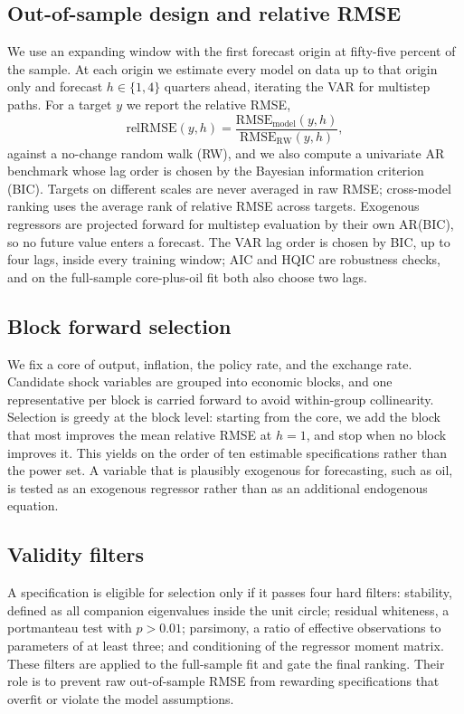 \documentclass[conference]{IEEEtran}
\begin{document}
\subsection{Out-of-sample design and relative RMSE}
We use an expanding window with the first forecast origin at fifty-five percent of the sample. At each origin we estimate every model on data up to that origin only and forecast $h\in\{1,4\}$ quarters ahead, iterating the VAR for multistep paths. For a target $y$ we report the relative RMSE,
\begin{equation}
\mathrm{relRMSE}(y,h) = \frac{\mathrm{RMSE}_{\text{model}}(y,h)}{\mathrm{RMSE}_{\text{RW}}(y,h)},
\end{equation}
against a no-change random walk (RW), and we also compute a univariate AR benchmark whose lag order is chosen by the Bayesian information criterion (BIC). Targets on different scales are never averaged in raw RMSE; cross-model ranking uses the average rank of relative RMSE across targets. Exogenous regressors are projected forward for multistep evaluation by their own AR(BIC), so no future value enters a forecast. The VAR lag order is chosen by BIC, up to four lags, inside every training window; AIC and HQIC are robustness checks, and on the full-sample core-plus-oil fit both also choose two lags.

\subsection{Block forward selection}
We fix a core of output, inflation, the policy rate, and the exchange rate. Candidate shock variables are grouped into economic blocks, and one representative per block is carried forward to avoid within-group collinearity. Selection is greedy at the block level: starting from the core, we add the block that most improves the mean relative RMSE at $h=1$, and stop when no block improves it. This yields on the order of ten estimable specifications rather than the power set. A variable that is plausibly exogenous for forecasting, such as oil, is tested as an exogenous regressor rather than as an additional endogenous equation.

\subsection{Validity filters}
A specification is eligible for selection only if it passes four hard filters: stability, defined as all companion eigenvalues inside the unit circle; residual whiteness, a portmanteau test with $p>0.01$; parsimony, a ratio of effective observations to parameters of at least three; and conditioning of the regressor moment matrix. These filters are applied to the full-sample fit and gate the final ranking. Their role is to prevent raw out-of-sample RMSE from rewarding specifications that overfit or violate the model assumptions.
\end{document}
